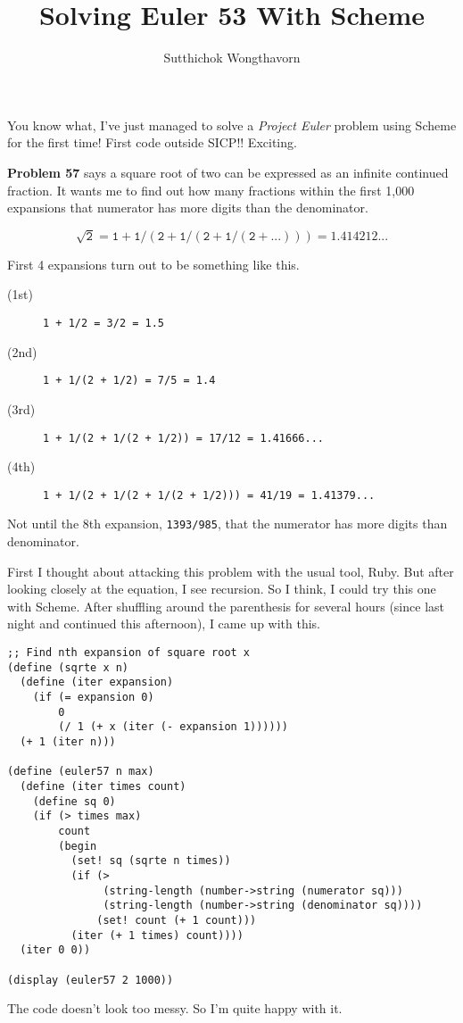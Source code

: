 \documentclass[a4paper]{article}
\title{Solving Euler 53 With Scheme}
\author{Sutthichok Wongthavorn}
\begin{document}
\maketitle

You know what, I’ve just managed to solve a \emph{Project Euler} problem using Scheme for the first time! First code outside SICP!! Exciting.

{\bf Problem 57} says a square root of two can be expressed as an infinite continued fraction. It wants me to find out how many fractions within the first 1,000 expansions that numerator has more digits than the denominator.

$$\mathtt{\sqrt 2 = 1 + 1 / (2 + 1 / (2 + 1 / (2 + ...))) = 1.414212...}$$

First 4 expansions turn out to be something like this.

\begin{description}
\item[(1st)] \texttt{1 + 1/2 = 3/2 = 1.5}
\item[(2nd)] \texttt{1 + 1/(2 + 1/2) = 7/5 = 1.4}
\item[(3rd)] \texttt{1 + 1/(2 + 1/(2 + 1/2)) = 17/12 = 1.41666...}
\item[(4th)] \texttt{1 + 1/(2 + 1/(2 + 1/(2 + 1/2))) = 41/19 = 1.41379...}
\end{description}

Not until the 8th expansion, \texttt{1393/985}, that the numerator has more digits than denominator.

First I thought about attacking this problem with the usual tool, Ruby. But after looking closely at the equation, I see recursion. So I think, I could try this one with Scheme. After shuffling around the parenthesis for several hours (since last night and continued this afternoon), I came up with this.

\begin{lstlisting}
;; Find nth expansion of square root x
(define (sqrte x n)
  (define (iter expansion)
    (if (= expansion 0)
        0
        (/ 1 (+ x (iter (- expansion 1))))))
  (+ 1 (iter n)))

(define (euler57 n max)
  (define (iter times count)
    (define sq 0)
    (if (> times max)
        count
        (begin
          (set! sq (sqrte n times))
          (if (>
               (string-length (number->string (numerator sq)))
               (string-length (number->string (denominator sq))))
              (set! count (+ 1 count)))
          (iter (+ 1 times) count))))
  (iter 0 0))

(display (euler57 2 1000))
\end{lstlisting}

The code doesn’t look too messy. So I’m quite happy with it.
\end{document}
